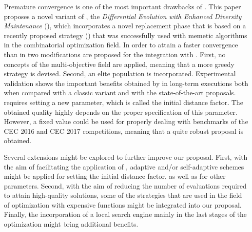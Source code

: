 Premature convergence is one of the most important drawbacks of \DE{}.
%
This paper proposes a novel variant of \DE{}, the \textit{Differential Evolution with Enhanced Diversity Maintenance} (\DEEDM{}),
which incorporates a novel replacement phase that is based on a recently proposed strategy (\RMDDC{}) that was successfully
used with memetic algorithms in the combinatorial optimization field.
%
In order to attain a faster convergence than in \RMDDC{} two modifications are proposed for the integration with \DE{}.
%
First, no concepts of the multi-objective field are applied, meaning that a more greedy strategy is devised.
%
Second, an elite population is incorporated.
%
Experimental validation shows the important benefits obtained by \DEEDM{} in long-term executions both when compared with a classic \DE{} variant and with
the state-of-the-art proposals.
%
\DEEDM{} requires setting a new parameter, which is called the initial distance factor.
%
The obtained quality highly depends on the proper specification of this parameter.
%
However, a fixed value could be used for properly dealing with benchmarks of the CEC 2016 and CEC 2017 competitions,
meaning that a quite robust proposal is obtained.

Several extensions might be explored to further improve our proposal.
%
First, with the aim of facilitating the application of \DEEDM{}, adaptive and/or self-adaptive schemes might be applied for setting the initial distance
factor, as well as for other \DE{} parameters.
%
Second, with the aim of reducing the number of evaluations required to attain high-quality solutions, some of the strategies that are used in the
field of optimization with expensive functions might be integrated into our proposal.
%
Finally, the incorporation of a local search engine mainly in the last stages of the optimization might bring additional benefits.
